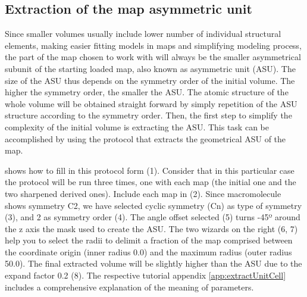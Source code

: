 \subsection*{Extraction of the map asymmetric unit}
Since smaller volumes usually include lower number of individual structural elements, making easier fitting models in maps and simplifying modeling process, the part of the map chosen to work with will always be the smaller asymmetrical subunit of the starting loaded map, also known as asymmetric unit (ASU). The size of the ASU thus depends on the symmetry order of the initial volume. The higher the symmetry order, the smaller the ASU. The atomic structure of the whole volume will be obtained straight forward by simply repetition of the ASU structure according to the symmetry order. Then, the first step to simplify the complexity of the initial volume is extracting the ASU. This task can be accomplished by using the \scipion protocol  that extracts the geometrical ASU of the map. 

 shows how to fill in this protocol form (1). Consider that in this particular case the protocol will be run three times, one with each map (the initial one and the two sharpened derived ones). Include each map in  (2). Since  macromolecule shows symmetry C2, we have selected cyclic symmetry (Cn) as type of symmetry (3), and 2 as symmetry order (4). The angle offset selected (5) turns -45º around the z axis the mask used to create the ASU. 
The two wizards on the right (6, 7) help you to select the radii to delimit a fraction of the map comprised between the coordinate origin (inner radius 0.0) and the maximum radius (outer radius 50.0). The final extracted volume will be slightly higher than the ASU due to the expand factor 0.2 (8). %
The respective tutorial appendix \ref{app:extractUnitCell} includes a comprehensive explanation of the meaning of parameters. 

